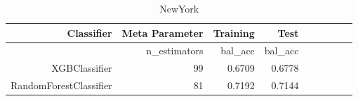 
\begin{table}[H]
    \caption{NewYork}
    \centering
    \begin{tabular}{|r|r|r|r|r|r|r|r|r|}
        \hline
        Classifier &Meta Parameter
        &Training
        &Test
        \\\hline
        &n\_estimators
        &bal\_acc
        &bal\_acc
        \\
        \hline
        XGBClassifier &99 &0.6709 
        &0.6778\\
        \hline
        RandomForestClassifier &81 &0.7192
        &0.7144\\
        \hline
    \end{tabular}
\end{table}
